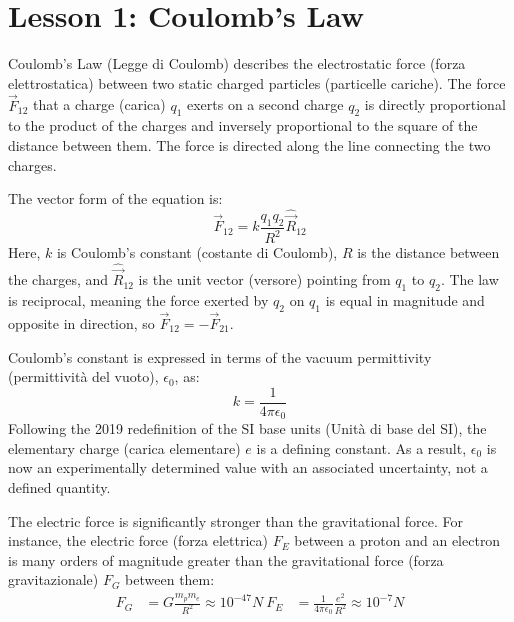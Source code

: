 \section*{Lesson 1: Coulomb's Law}

Coulomb's Law (Legge di Coulomb) describes the electrostatic force (forza elettrostatica) between two static charged particles (particelle cariche). The force \(\vec{F}_{12}\) that a charge (carica) \(q_{1}\) exerts on a second charge \(q_{2}\) is directly proportional to the product of the charges and inversely proportional to the square of the distance between them. The force is directed along the line connecting the two charges.

The vector form of the equation is:
\begin{equation} 
    \vec{F}_{12} = k \frac{q_1 q_2}{R^2} \hat{\vec{R}}_{12}
\end{equation}
Here, \(k\) is Coulomb's constant (costante di Coulomb), \(R\) is the distance between the charges, and \(\hat{\vec{R}}_{12}\) is the unit vector (versore) pointing from \(q_{1}\) to \(q_{2}\). The law is reciprocal, meaning the force exerted by \(q_{2}\) on \(q_{1}\) is equal in magnitude and opposite in direction, so \(\vec{F}_{12} = -\vec{F}_{21}\).

Coulomb's constant is expressed in terms of the vacuum permittivity (permittività del vuoto), \(\epsilon_{0}\), as:
\begin{equation} 
    k = \frac{1}{4\pi\epsilon_{0}}
\end{equation}
Following the 2019 redefinition of the SI base units (Unità di base del SI), the elementary charge (carica elementare) \(e\) is a defining constant. As a result, \(\epsilon_{0}\) is now an experimentally determined value with an associated uncertainty, not a defined quantity.

The electric force is significantly stronger than the gravitational force. For instance, the electric force (forza elettrica) \(F_{E}\) between a proton and an electron is many orders of magnitude greater than the gravitational force (forza gravitazionale) \(F_{G}\) between them:
\begin{align}
    F_G &= G \frac{m_p m_e}{R^2} \approx 10^{-47} N \ 
    F_E &= \frac{1}{4\pi\epsilon_{0}} \frac{e^2}{R^2} \approx 10^{-7} N
\end{align}